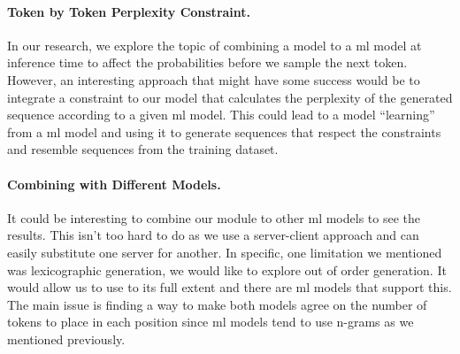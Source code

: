 \documentclass[../Document.tex]{subfiles}
\begin{document}
\paragraph{Token by Token Perplexity Constraint.}
In our research, we explore the topic of combining a \cp model to a \gls{ml} model at inference time to affect the probabilities before we sample the next token.
However, an interesting approach that might have some success would be to integrate a constraint to our \cp model that calculates the perplexity of the generated sequence according to a given \gls{ml} model.
This could lead to a \cp model ``learning'' from a \gls{ml} model and using it to generate sequences that respect the constraints and resemble sequences from the training dataset.


\paragraph{Combining with Different Models.}
It could be interesting to combine our \cpbp module to other \gls{ml} models to see the results.
This isn't too hard to do as we use a server-client approach and can easily substitute one server for another.
In specific, one limitation we mentioned was lexicographic generation, we would like to explore out of order generation.
It would allow us to use \cp to its full extent and there are \gls{ml} models that support this.
The main issue is finding a way to make both models agree on the number of tokens to place in each position since \gls{ml} models tend to use n-grams as we mentioned previously.
\end{document}
